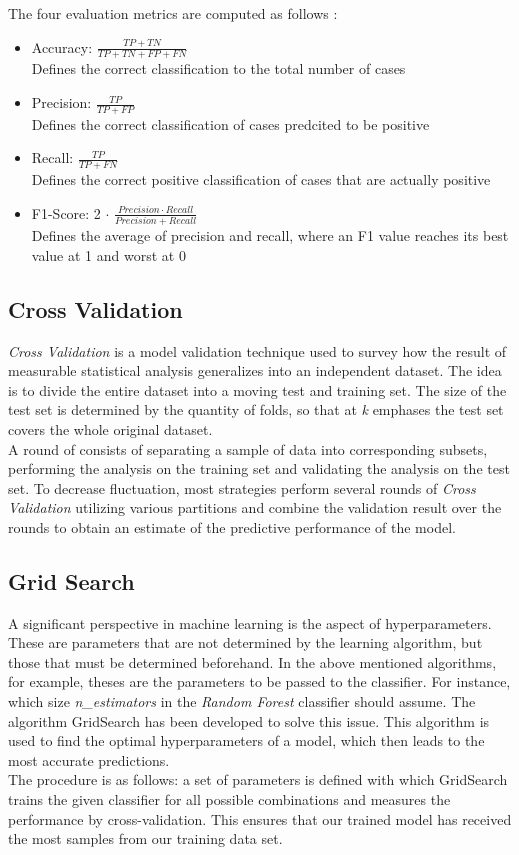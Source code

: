 \documentclass[a4paper, 11pt,titlepage,oneside,openany]{book}
\begin{document}
\noindent The four evaluation metrics are computed as follows \cite{algorithms}:
\begin{itemize}
	\item Accuracy: $\frac{TP+TN}{TP+TN+FP+FN}$\\
					Defines the correct classification to the total number of cases
	\item Precision: $\frac{TP}{TP+FP}$\\
	Defines the correct classification of cases predcited to be positive
	\item Recall: $\frac{TP}{TP+FN}$\\
	Defines the correct positive classification of cases that are actually positive
	\item F1-Score: 2 $\cdot$ $\frac{Precision \cdot Recall}{Precision+Recall}$\\
	Defines the average of precision and recall,
	where an F1 value reaches its best value at 1
	and worst at 0
\end{itemize}\newpage
\subsection{Cross Validation}
\textit{Cross Validation} is a model validation technique used to survey how the result of measurable statistical analysis generalizes into an independent dataset. The idea is to divide the entire dataset into a moving test and training set. The size of the test set is determined by the quantity of folds, so that at \textit{k} emphases the test set covers the whole original dataset.\\
\noindent A round of  consists of separating a sample of data into corresponding subsets, performing the analysis on the training set and validating the analysis on the test set. To decrease fluctuation, most strategies perform several rounds of \textit{Cross Validation} utilizing various partitions and combine the validation result over the rounds to obtain an estimate of the predictive performance of the model.

\subsection{Grid Search}
A significant perspective in machine learning is the aspect of hyperparameters. These are parameters that are not determined by the learning algorithm, but those that must be determined beforehand. In the above mentioned algorithms, for example, theses are the parameters to be passed to the classifier. For instance, which size \textit{n\_estimators} in the \textit{Random Forest} classifier should assume. The algorithm GridSearch has been developed to solve this issue. This algorithm is used to find the optimal hyperparameters of a model, which then leads to the most accurate predictions. \\
\noindent The procedure is as follows: a set of parameters is defined with which GridSearch trains the given classifier for all possible combinations and measures the performance by cross-validation. This ensures that our trained model has received the most samples from our training data set. 
\end{document}
